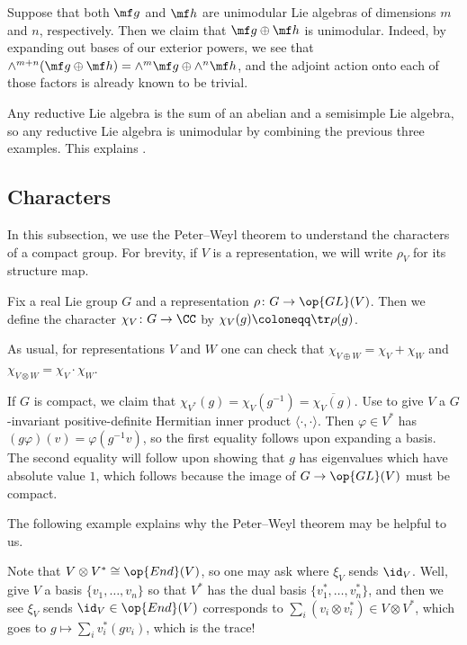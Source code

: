 \documentclass{amsart}
\begin{document}
\begin{example} \label{ex:unimodular-sums}
	Suppose that both $\mf g$ and $\mf h$ are unimodular Lie algebras of dimensions $m$ and $n$, respectively. Then we claim that $\mf g\oplus\mf h$ is unimodular. Indeed, by expanding out bases of our exterior powers, we see that $\land^{m+n}(\mf g\oplus\mf h)=\land^m\mf g\oplus\land^n\mf h$, and the adjoint action onto each of those factors is already known to be trivial.
\end{example}
\begin{example}
	Any reductive Lie algebra is the sum of an abelian and a semisimple Lie algebra, so any reductive Lie algebra is unimodular by combining the previous three examples. This explains .
\end{example}

\subsection{Characters}
In this subsection, we use the Peter--Weyl theorem to understand the characters of a compact group. For brevity, if $V$ is a representation, we will write $\rho_V$ for its structure map.
\begin{definition}
	Fix a real Lie group $G$ and a representation $\rho\colon G\to\op{GL}(V)$. Then we define the character $\chi_V\colon G\to\CC$ by $\chi_V(g)\coloneqq\tr\rho(g)$.
\end{definition}
\begin{remark} \label{rem:char-sum-tensor}
	As usual, for representations $V$ and $W$ one can check that $\chi_{V\oplus W}=\chi_V+\chi_W$ and $\chi_{V\otimes W}=\chi_V\cdot\chi_W$.
\end{remark}
\begin{remark} \label{rem:char-dual}
	If $G$ is compact, we claim that $\chi_{V^*}(g)=\chi_V\left(g^{-1}\right)=\overline{\chi_V(g)}$. Use  to give $V$ a $G$-invariant positive-definite Hermitian inner product $\langle\cdot,\cdot\rangle$. Then $\varphi\in V^*$ has $(g\varphi)(v)=\varphi\left(g^{-1}v\right)$, so the first equality follows upon expanding a basis. The second equality will follow upon showing that $g$ has eigenvalues which have absolute value $1$, which follows because the image of $G\to\op{GL}(V)$ must be compact.
\end{remark}
The following example explains why the Peter--Weyl theorem may be helpful to us.
\begin{example} \label{ex:get-char}
	Note that $V\otimes V^*\cong\op{End}(V)$, so one may ask where $\xi_V$ sends $\id_V$. Well, give $V$ a basis $\{v_1,\ldots,v_n\}$ so that $V^*$ has the dual basis $\{v_1^*,\ldots,v_n^*\}$, and then we see $\xi_V$ sends $\id_V\in\op{End}(V)$ corresponds to $\sum_i(v_i\otimes v_i^*)\in V\otimes V^*$, which goes to $g\mapsto\sum_iv_i^*(gv_i)$, which is the trace!
\end{example}
\end{document}

